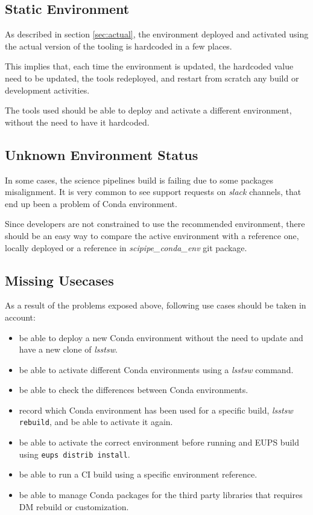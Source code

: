 \subsection{Static Environment} \label{sec:static}

As described in section \ref{sec:actual}, the environment deployed and activated using the actual version of the tooling is hardcoded in a few places.

This implies that, each time the environment is updated, the hardcoded value need to be updated, the tools redeployed, and restart from scratch any build or development activities.

The tools used should be able to deploy and activate a different environment, without the need to have it hardcoded.


\subsection{Unknown Environment Status} \label{sec:unknown}

In some cases, the science pipelines build is failing due to some packages misalignment. 
It is very common to see support requests on \textit{slack} channels, that end up been a problem of Conda environment.

Since developers are not constrained to use the recommended environment, there should be an easy way to compare the active environment  with a reference one, locally deployed or a reference in \textit{scipipe\_conda\_env} git package.


\subsection{Missing Usecases}

As a result of the problems exposed above, following use cases should be taken in account:

\begin{itemize}
\item be able to deploy a new Conda environment without the need to update and have a new clone of \textit{lsstsw}.
\item be able to activate different Conda environments using a \textit{lsstsw} command.
\item be able to check the differences between Conda environments.
\item record which Conda environment has been used for a specific build, \textit{lsstsw} \texttt{rebuild}, and be able to activate it again.
\item be able to activate the correct environment before running and EUPS build using \texttt{eups distrib install}.
\item be able to run a CI build using a specific environment reference.
\item be able to manage Conda packages for the third party libraries that requires DM rebuild or customization.
\end{itemize}


